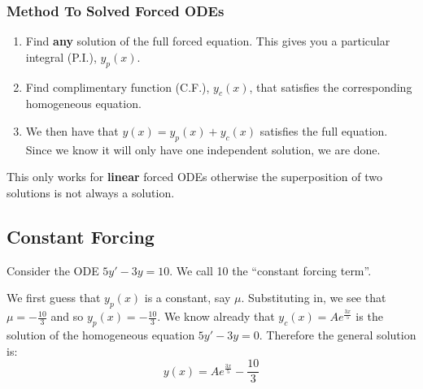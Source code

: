\documentclass[../main.tex]{subfiles}
\begin{document}
\subsubsection{Method To Solved Forced ODEs}
\begin{enumerate}
  \item Find \textbf{any} solution of the full forced equation.
    This gives you a particular integral (P.I.), $y_p(x)$.
  \item Find complimentary function (C.F.), $y_c(x)$, that satisfies the corresponding homogeneous equation.
  \item We then have that $y(x) = y_p(x) + y_c(x)$ satisfies the full equation.
    Since we know it will only have one independent solution, we are done.
\end{enumerate}
\begin{remark}[Warning]
  This only works for \textbf{linear} forced ODEs otherwise the superposition of two solutions is not always a solution.
\end{remark}
\subsection{Constant Forcing}
\begin{example}
  Consider the ODE $5y' - 3y = 10$.
  We call 10 the ``constant forcing term''.

  We first guess that $y_p(x)$ is a constant, say $\mu$.
  Substituting in, we see that $\mu = - \frac{10}{3}$ and so $y_p(x) = - \frac{10}{3}$.
  We know already that $y_c(x) = Ae^{\frac{3x}{5}}$ is the solution of the homogeneous equation $5y' - 3y = 0$.
  Therefore the general solution is:
  \[
    y(x) = Ae^{\frac{3x}{5}} - \frac{10}{3}
  \]
\end{example}
\end{document}

